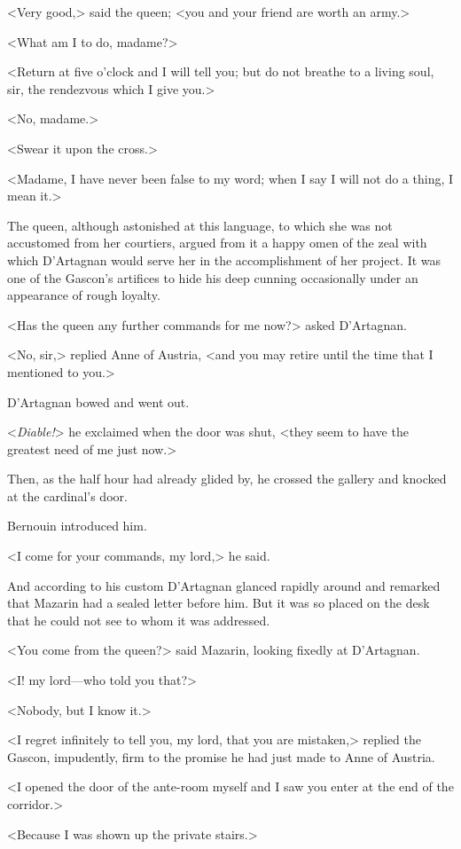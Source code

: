 <Very good,> said the queen; <you and your friend are worth an army.>

<What am I to do, madame?>

<Return at five o'clock and I will tell you; but do not breathe to a living soul, sir, the rendezvous which I give you.>

<No, madame.>

<Swear it upon the cross.>

<Madame, I have never been false to my word; when I say I will not do a thing, I mean it.>

The queen, although astonished at this language, to which she was not accustomed from her courtiers, argued from it a happy omen of the zeal with which D'Artagnan would serve her in the accomplishment of her project. It was one of the Gascon's artifices to hide his deep cunning occasionally under an appearance of rough loyalty.

<Has the queen any further commands for me now?> asked D'Artagnan.

<No, sir,> replied Anne of Austria, <and you may retire until the time that I mentioned to you.>

D'Artagnan bowed and went out.

<\textit{Diable!}> he exclaimed when the door was shut, <they seem to have the greatest need of me just now.>

Then, as the half hour had already glided by, he crossed the gallery and knocked at the cardinal's door.

Bernouin introduced him.

<I come for your commands, my lord,> he said.

And according to his custom D'Artagnan glanced rapidly around and remarked that Mazarin had a sealed letter before him. But it was so placed on the desk that he could not see to whom it was addressed.

<You come from the queen?> said Mazarin, looking fixedly at D'Artagnan.

<I! my lord—who told you that?>

<Nobody, but I know it.>

<I regret infinitely to tell you, my lord, that you are mistaken,> replied the Gascon, impudently, firm to the promise he had just made to Anne of Austria.

<I opened the door of the ante-room myself and I saw you enter at the end of the corridor.>

<Because I was shown up the private stairs.>

